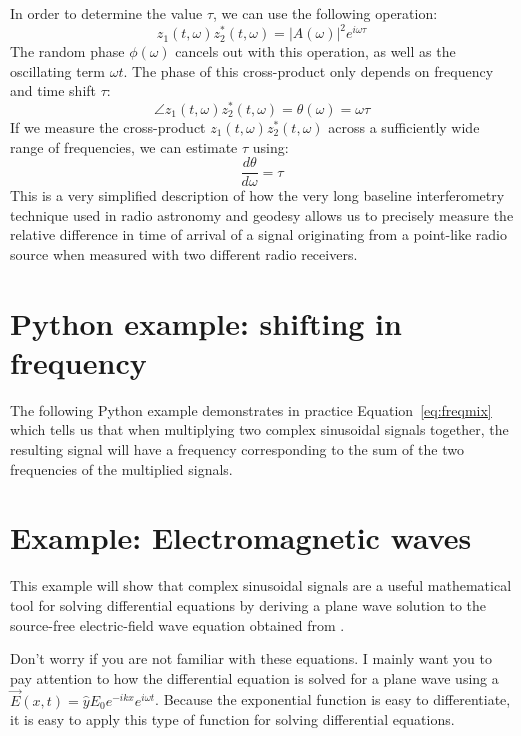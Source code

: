 In order to determine the value $\tau$, we can use the following operation:
\begin{equation}
  z_1(t,\omega)z_2^*(t,\omega) = |A(\omega)|^2 e^{i\omega \tau}
\end{equation}
The random phase $\phi(\omega)$ cancels out with this operation, as well as the oscillating
term $\omega t$. The phase of this cross-product only depends on frequency and time shift $\tau$:
\begin{equation}
  \angle z_1(t,\omega)z_2^*(t,\omega) = \theta(\omega)= \omega \tau
\end{equation}
If we measure the cross-product $z_1(t,\omega)z_2^*(t,\omega)$ across a sufficiently
wide range of frequencies, we can estimate $\tau$ using:
\begin{equation}
  \frac{d\theta}{d\omega}= \tau
\end{equation}
This is a very simplified description of how the very long baseline interferometry
technique used in radio astronomy and geodesy allows us to precisely measure the
relative difference in time of arrival of a signal originating from a point-like
radio source when measured with two different radio receivers.


\section{Python example: shifting in frequency}

The following Python example demonstrates in practice
Equation~\ref{eq:freqmix} which tells us that when multiplying two
complex sinusoidal signals together, the resulting signal will have a frequency corresponding to the sum of the two frequencies of the multiplied signals.



\section{Example: Electromagnetic waves}
\label{waveeq}

This example will show that complex sinusoidal signals are a useful
mathematical tool for solving differential equations by deriving a plane wave
solution to the source-free electric-field wave equation obtained from
.

Don't worry if you are not familiar with these equations. I mainly want you to pay attention to
how the differential equation is solved for a plane wave using a
  $\vec{E}(x,t)=\hat{y}E_0 e^{-i k x}e^{i\omega t}$. Because the exponential function is easy to differentiate,
it is easy to apply this type of function for solving differential equations.

